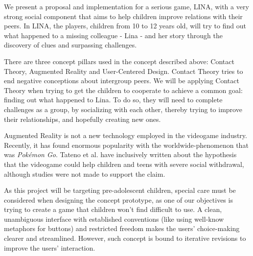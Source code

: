 \par We present a proposal and implementation for a serious game, LINA, with a very strong social component that aims to help children improve relations with their peers. In LINA, the players, children from 10 to 12 years old, will try to find out what happened to a missing colleague - Lina - and her story through the discovery of clues and surpassing challenges.
\par There are three concept pillars used in the concept described above: Contact Theory, Augmented Reality and User-Centered Design. Contact Theory tries to end negative conceptions about intergroup peers. We will be applying Contact Theory when trying to get the children to cooperate to achieve a common goal: finding out what happened to Lina. To do so, they will need to complete challenges as a group, by socializing with each other, thereby trying to improve their relationships, and hopefully creating new ones. 
\par Augmented Reality is not a new technology employed in the videogame industry. Recently, it has found enormous popularity with the worldwide-phenomenon that was \textit{Pokémon Go}. Tateno et al. have inclusively written about the hypothesis that the videogame could help children and teens with severe social withdrawal, although studies were not made to support the claim.\cite{tateno_skokauskas_kato_teo_guerrero_2016}
\par As this project will be targeting pre-adolescent children, special care must be considered when designing the concept prototype, as one of our objectives is trying to create a game that children won't find difficult to use. A clean, unambiguous interface with established conventions (like using well-know metaphors for buttons) and restricted freedom makes the users' choice-making clearer and streamlined. However, such concept is bound to iterative revisions to improve the users' interaction.
